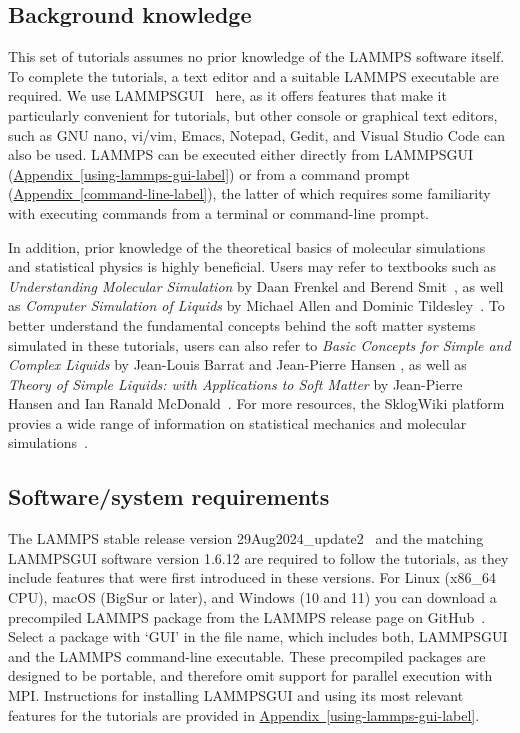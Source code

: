 \documentclass[9pt,tutorial]{livecoms}
\newcommand{\lammpsgui}{\textsf{LAMMPS\textendash GUI}}
\begin{document}
\subsection{Background knowledge}

This set of tutorials assumes no prior knowledge of the LAMMPS software
itself.  To complete the tutorials, a text editor and a suitable LAMMPS
executable are required.  We use \lammpsgui{}~\cite{lammps_gui_docs}
here, as it offers features that make it particularly convenient for
tutorials, but other console or graphical text editors, such as GNU
nano, vi/vim, Emacs, Notepad, Gedit, and Visual Studio Code can also be
used.  LAMMPS can be executed either directly from \lammpsgui{}
(\hyperref[using-lammps-gui-label]{Appendix~\ref{using-lammps-gui-label}})
or from a command prompt
(\hyperref[command-line-label]{Appendix~\ref{command-line-label}}), the
latter of which requires some familiarity with executing commands from a
terminal or command-line prompt.

In addition, prior knowledge of the theoretical basics of molecular
simulations and statistical physics is highly beneficial.  Users may
refer to textbooks such as \textit{Understanding Molecular Simulation} by
Daan Frenkel and Berend Smit~\cite{frenkel2023understanding}, as well as
\textit{Computer Simulation of Liquids} by Michael Allen and Dominic
Tildesley~\cite{allen2017computer}.  To better understand
the fundamental concepts behind the soft matter systems simulated in these
tutorials, users can also refer to \textit{Basic Concepts for Simple and
  Complex Liquids} by Jean-Louis Barrat and Jean-Pierre Hansen
\cite{barrat2003basic}, as well as \textit{Theory of Simple Liquids:
  with Applications to Soft Matter} by Jean-Pierre Hansen and Ian Ranald
McDonald~\cite{hansen2013theory}.  For more resources, the SklogWiki
platform provies a wide range of information on statistical mechanics
and molecular simulations~\cite{sklogwiki_main_page}.

\subsection{Software/system requirements}

The LAMMPS stable release version 29Aug2024\_update2~\cite{lammps_code}
and the matching \lammpsgui{} software version 1.6.12 are required to
follow the tutorials, as they include features that were first
introduced in these versions.  For Linux (x86\_64 CPU), macOS (BigSur or
later), and Windows (10 and 11) you can download a precompiled LAMMPS
package from the LAMMPS release page on
GitHub~\cite{lammps_github_release}.  Select a package with `GUI' in the
file name, which includes both, \lammpsgui{} and the LAMMPS command-line
executable.  These precompiled packages are designed to be portable, and
therefore omit support for parallel execution with MPI.  Instructions
for installing \lammpsgui{} and using its most relevant features for the
tutorials are provided in
\hyperref[using-lammps-gui-label]{Appendix~\ref{using-lammps-gui-label}}.
\end{document}
